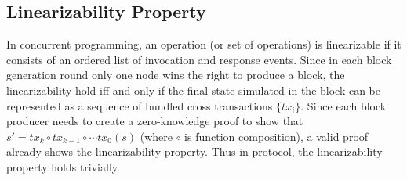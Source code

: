 



\subsection{Linearizability Property}
In concurrent programming, an operation (or set of operations) is linearizable if it consists of an ordered list of invocation and response events. Since in each block generation round only one node wins the right to produce a block, the linearizability hold iff and only if the final state simulated in the block can be represented as a sequence of bundled cross transactions $\{tx_i\}$. Since each block producer needs to create a zero-knowledge proof to show that $s' = tx_k \circ tx_{k-1} \circ \cdots tx_0(s)$ (where $\circ$ is function composition), a valid proof already shows the linearizability property. Thus in \dprotocol protocol, the linearizability property holds trivially. 

